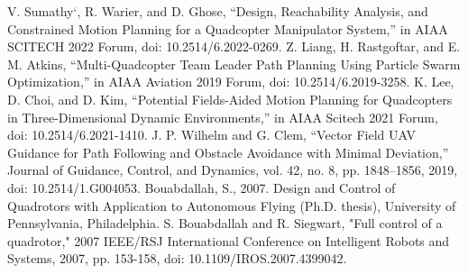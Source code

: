 \documentclass[conference]{IEEEtran}
\begin{document}
\begin{thebibliography}{00}
 V. Sumathy`, R. Warier, and D. Ghose, “Design, Reachability Analysis, and Constrained Motion Planning for a Quadcopter Manipulator System,” in AIAA SCITECH 2022 Forum, doi: 10.2514/6.2022-0269.
 Z. Liang, H. Rastgoftar, and E. M. Atkins, “Multi-Quadcopter Team Leader Path Planning Using Particle Swarm Optimization,” in AIAA Aviation 2019 Forum, doi: 10.2514/6.2019-3258.
 K. Lee, D. Choi, and D. Kim, “Potential Fields-Aided Motion Planning for Quadcopters in Three-Dimensional Dynamic Environments,” in AIAA Scitech 2021 Forum, doi: 10.2514/6.2021-1410.
 J. P. Wilhelm and G. Clem, “Vector Field UAV Guidance for Path Following and Obstacle Avoidance with Minimal Deviation,” Journal of Guidance, Control, and Dynamics, vol. 42, no. 8, pp. 1848–1856, 2019, doi: 10.2514/1.G004053.
 Bouabdallah, S., 2007. Design and Control of Quadrotors with Application to
Autonomous Flying (Ph.D. thesis), University of Pennsylvania, Philadelphia.
 S. Bouabdallah and R. Siegwart, "Full control of a quadrotor," 2007 IEEE/RSJ International Conference on Intelligent Robots and Systems, 2007, pp. 153-158, doi: 10.1109/IROS.2007.4399042.


\end{thebibliography}
\vspace{12pt}
\end{document}
